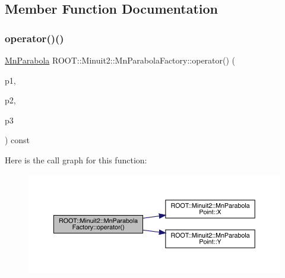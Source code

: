 \subsection{Member Function Documentation}
\mbox{\label{classROOT_1_1Minuit2_1_1MnParabolaFactory_aa5ff96ea03013f1dcbbac298fe26e484}} 
\subsubsection{\texorpdfstring{operator()()}{operator()()}\hspace{0.1cm}{\footnotesize\ttfamily [1/6]}}
{\footnotesize\ttfamily \mbox{\hyperlink{classROOT_1_1Minuit2_1_1MnParabola}{Mn\+Parabola}} R\+O\+O\+T\+::\+Minuit2\+::\+Mn\+Parabola\+Factory\+::operator() (\begin{DoxyParamCaption}\item[{const \mbox{\hyperlink{classROOT_1_1Minuit2_1_1MnParabolaPoint}{Mn\+Parabola\+Point}} \&}]{p1,  }\item[{const \mbox{\hyperlink{classROOT_1_1Minuit2_1_1MnParabolaPoint}{Mn\+Parabola\+Point}} \&}]{p2,  }\item[{const \mbox{\hyperlink{classROOT_1_1Minuit2_1_1MnParabolaPoint}{Mn\+Parabola\+Point}} \&}]{p3 }\end{DoxyParamCaption}) const}

Here is the call graph for this function\+:
\nopagebreak
\begin{figure}[H]
\begin{center}
\leavevmode
\includegraphics[width=350pt]{d2/dd8/classROOT_1_1Minuit2_1_1MnParabolaFactory_aa5ff96ea03013f1dcbbac298fe26e484_cgraph}
\end{center}
\end{figure}
\mbox{\label{classROOT_1_1Minuit2_1_1MnParabolaFactory_aa5ff96ea03013f1dcbbac298fe26e484}} 
